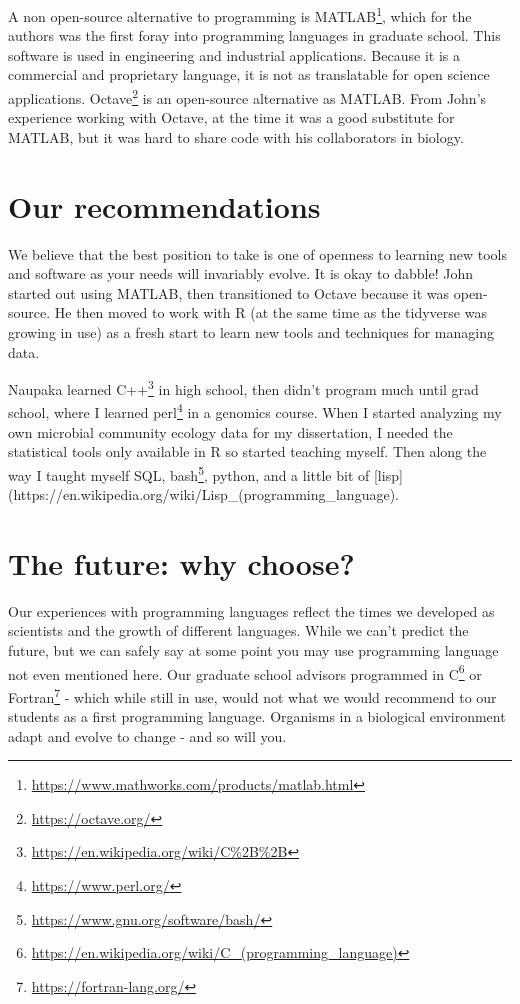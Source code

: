 \documentclass[
  letterpaper,
]{krantz}
\renewcommand{\href}[2]{#2\footnote{\url{#1}}}
\begin{document}
A non open-source alternative to programming is
\href{https://www.mathworks.com/products/matlab.html}{MATLAB}, which for
the authors was the first foray into programming languages in graduate
school. This software is used in engineering and industrial
applications. Because it is a commercial and proprietary language, it is
not as translatable for open science applications.
\href{https://octave.org/}{Octave} is an open-source alternative as
MATLAB. From John's experience working with Octave, at the time it was a
good substitute for MATLAB, but it was hard to share code with his
collaborators in biology.

\section{Our recommendations}\label{our-recommendations}

We believe that the best position to take is one of openness to learning
new tools and software as your needs will invariably evolve. It is okay
to dabble! John started out using MATLAB, then transitioned to Octave
because it was open-source. He then moved to work with R (at the same
time as the tidyverse was growing in use) as a fresh start to learn new
tools and techniques for managing data.

Naupaka learned \href{https://en.wikipedia.org/wiki/C\%2B\%2B}{C++} in
high school, then didn't program much until grad school, where I learned
\href{https://www.perl.org/}{perl} in a genomics course. When I started
analyzing my own microbial community ecology data for my dissertation, I
needed the statistical tools only available in R so started teaching
myself. Then along the way I taught myself SQL,
\href{https://www.gnu.org/software/bash/}{bash}, python, and a little
bit of
{[}lisp{]}(https://en.wikipedia.org/wiki/Lisp\_(programming\_language).

\section{The future: why choose?}\label{the-future-why-choose}

Our experiences with programming languages reflect the times we
developed as scientists and the growth of different languages. While we
can't predict the future, but we can safely say at some point you may
use programming language not even mentioned here. Our graduate school
advisors programmed in
\href{https://en.wikipedia.org/wiki/C_(programming_language)}{C} or
\href{https://fortran-lang.org/}{Fortran} - which while still in use,
would not what we would recommend to our students as a first programming
language. Organisms in a biological environment adapt and evolve to
change - and so will you.
\end{document}
